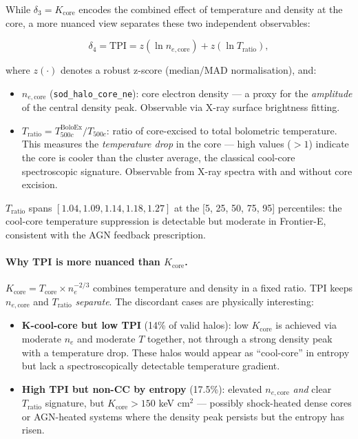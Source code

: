 \documentclass[12pt,a4paper]{article}
\begin{document}
While $\delta_3 = K_\mathrm{core}$ encodes the combined effect of temperature and
density at the core, a more nuanced view separates these two independent observables:

\begin{equation}
  \delta_4 = \mathrm{TPI} = z(\ln n_{e,\mathrm{core}}) + z(\ln T_\mathrm{ratio}),
\end{equation}

where $z(\cdot)$ denotes a robust z-score (median/MAD normalisation), and:
\begin{itemize}
  \item $n_{e,\mathrm{core}}$ (\texttt{sod\_halo\_core\_ne}): core electron density ---
        a proxy for the \emph{amplitude} of the central density peak.
        Observable via X-ray surface brightness fitting.
  \item $T_\mathrm{ratio} = T_{500c}^\mathrm{BoloEx} / T_{500c}$: ratio of core-excised
        to total bolometric temperature.
        This measures the \emph{temperature drop} in the core ---
        high values ($> 1$) indicate the core is cooler than the cluster average,
        the classical cool-core spectroscopic signature.
        Observable from X-ray spectra with and without core excision.
\end{itemize}

\noindent $T_\mathrm{ratio}$ spans $[1.04, 1.09, 1.14, 1.18, 1.27]$ at the
[5, 25, 50, 75, 95] percentiles: the cool-core temperature suppression is detectable
but moderate in Frontier-E, consistent with the AGN feedback prescription.

\paragraph{Why TPI is more nuanced than $K_\mathrm{core}$.}
$K_\mathrm{core} = T_\mathrm{core} \times n_e^{-2/3}$ combines temperature and density
in a fixed ratio. TPI keeps $n_{e,\mathrm{core}}$ and $T_\mathrm{ratio}$ \emph{separate}.
The discordant cases are physically interesting:
\begin{itemize}
  \item \textbf{K-cool-core but low TPI} (14\% of valid halos):
        low $K_\mathrm{core}$ is achieved via moderate $n_e$ and moderate $T$ together,
        not through a strong density peak with a temperature drop. These halos would
        appear as ``cool-core'' in entropy but lack a spectroscopically detectable
        temperature gradient.
  \item \textbf{High TPI but non-CC by entropy} (17.5\%):
        elevated $n_{e,\mathrm{core}}$ \emph{and} clear $T_\mathrm{ratio}$ signature, but
        $K_\mathrm{core} > 150$ keV cm$^2$ --- possibly shock-heated dense cores or
        AGN-heated systems where the density peak persists but the entropy has risen.
\end{itemize}
\end{document}
